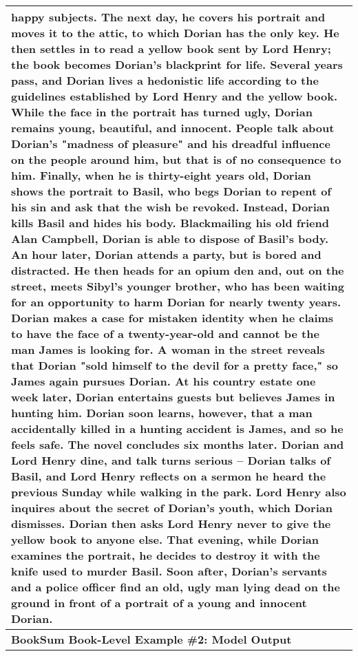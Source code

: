 \begin{table}[!htbp]
\begin{tabular}{p{\linewidth}}
happy subjects. The next day, he covers his portrait and moves it to the attic, to which Dorian has the only key. He then settles in to read a yellow book sent by Lord Henry; the book becomes Dorian's blackprint for life. Several years pass, and Dorian lives a hedonistic life according to the guidelines established by Lord Henry and the yellow book. While the face in the portrait has turned ugly, Dorian remains young, beautiful, and innocent. People talk about Dorian's "madness of pleasure" and his dreadful influence on the people around him, but that is of no consequence to him. Finally, when he is thirty-eight years old, Dorian shows the portrait to Basil, who begs Dorian to repent of his sin and ask that the wish be revoked. Instead, Dorian kills Basil and hides his body. Blackmailing his old friend Alan Campbell, Dorian is able to dispose of Basil's body. An hour later, Dorian attends a party, but is bored and distracted. He then heads for an opium den and, out on the street, meets Sibyl's younger brother, who has been waiting for an opportunity to harm Dorian for nearly twenty years. Dorian makes a case for mistaken identity when he claims to have the face of a twenty-year-old and cannot be the man James is looking for. A woman in the street reveals that Dorian "sold himself to the devil for a pretty face," so James again pursues Dorian. At his country estate one week later, Dorian entertains guests but believes James in hunting him. Dorian soon learns, however, that a man accidentally killed in a hunting accident is James, and so he feels safe. The novel concludes six months later. Dorian and Lord Henry dine, and talk turns serious -- Dorian talks of Basil, and Lord Henry reflects on a sermon he heard the previous Sunday while walking in the park. Lord Henry also inquires about the secret of Dorian's youth, which Dorian dismisses. Dorian then asks Lord Henry never to give the yellow book to anyone else. That evening, while Dorian examines the portrait, he decides to destroy it with the knife used to murder Basil. Soon after, Dorian's servants and a police officer find an old, ugly man lying dead on the ground in front of a portrait of a young and innocent Dorian.
    \\
    \midrule
    \textbf{BookSum Book-Level Example \#2: Model Output} \\
    \midrule

\end{tabular}
\end{table}
